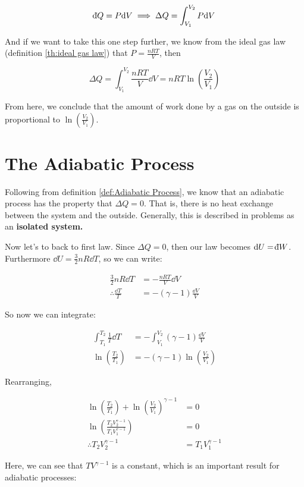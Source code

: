 \[ \db Q = P \dd V \implies \Delta Q = \int_{V_1}^{V_2} P \dd V\]

And if we want to take this one step further, we know from the ideal gas law (definition \ref{th:ideal gas law}) that $P = \frac{nRT}{V}$, then 

\[ \Delta Q = \int_{V_1}^{V_2} \frac{nRT}{V} \dd V  = nRT \ln\left(\frac{V_2}{V_1}\right)\]

From here, we conclude that the amount of work done by a gas on the outside is proportional to $\ln \left(\frac{V_2}{V_1}\right)$.

\section{The Adiabatic Process}

Following from definition \ref{def:Adiabatic Process}, we know that an adiabatic process has the property that $\Delta Q = 0$. That is, there is no heat exchange between the system and the outside. Generally, this is described in problems as an \textbf{isolated system.} 

Now let's to back to first law. Since $\Delta Q = 0$, then our law becomes $\dd U = \db W$. Furthermore $\dd U = \frac{3}{2} nR \dd T$, so we can write:

\begin{align*}
\frac{3}{2} nR \dd T &= -\frac{nRT}{V} \dd V\\
\therefore \frac{\dd T }{T} &= -(\gamma - 1) \frac{\dd V}{V}
\end{align*}

So now we can integrate: 

\begin{align*}
\int_{T_1}^{T_2} \frac{1}{T} \dd T &= -\int_{V_1}^{V_2} (\gamma -1) \frac{\dd V}{V}\\
\ln \left(\frac{T_2}{T_1}\right) &= -(\gamma -1) \ln\left(\frac{V_2}{V_1}\right)
\end{align*}

Rearranging, 

\begin{align*}
\ln\left(\frac{T_2}{T_1}\right) + \ln\left(\frac{V_2}{V_1}\right)^{\gamma -1} &= 0\\
\ln\left(\frac{T_2V_2^{\gamma -1}}{T_1V_1^{\gamma -1}}\right) &= 0\\
\therefore T_2V_2^{\gamma -1} &= T_1V_1^{\gamma -1}
\end{align*}

Here, we can see that $TV^{\gamma - 1}$ is a constant, which is an important result for adiabatic processes: 

